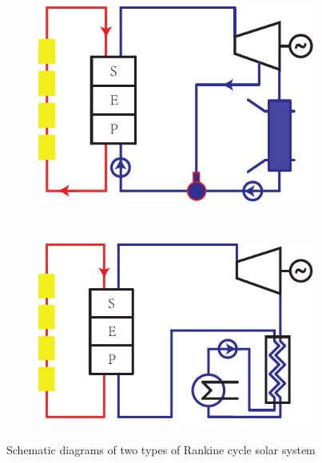 \noindent \begin{figure}[htbp]
\centering
	\begin{subfigure}[b]{0.4\columnwidth}
	\includegraphics[width = \columnwidth]{fig/TypicalSteamRankineSolarSystem}
	\caption{}\label{fig:TypicalSteamRankineSolarSystem}
	\end{subfigure}
	~
\begin{subfigure}[b]{0.4\columnwidth}
	\includegraphics[width = \columnwidth]{fig/TypicalOrganicRankineSolarSystem}
	\caption{}\label{fig:TypicalOrganicRankineSolarSystem}
	\end{subfigure}
	\caption{Schematic diagrams of two types of Rankine cycle solar system}
	\label{fig:TwoTypesOfRankineCycle}
\end{figure}

